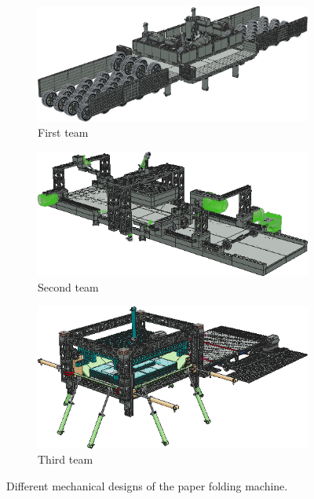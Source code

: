 \documentclass{PDS}
\begin{document}
\begin{figure}[htbp]
    \begin{subfigure}[b]{0.32\textwidth}
        \includegraphics[width=\textwidth]{./figures/paper_1.png}
        \caption{First team}
        \label{fig:paper_1}
    \end{subfigure}
    \hfill
    \begin{subfigure}[b]{0.32\textwidth}
        \includegraphics[width=\textwidth]{./figures/paper_2.png}
        \caption{Second team}
        \label{fig:paper_2}
    \end{subfigure}
    \hfill
    \begin{subfigure}[b]{0.32\textwidth}
        \includegraphics[width=\textwidth]{./figures/paper_3.png}
        \caption{Third team}
        \label{fig:paper_3}
    \end{subfigure}
    \caption{Different mechanical designs of the paper folding machine.}
    \label{fig:paper}
\end{figure}
\end{document}
